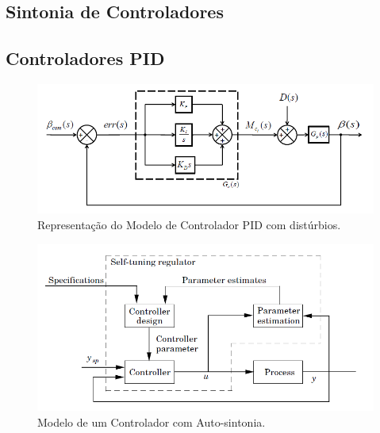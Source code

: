 \subsection{Sintonia de Controladores}


\subsection{Controladores PID}

\begin{figure}[htb]
  \caption{Representação do Modelo de Controlador PID com distúrbios.}
  \begin{center}
      \includegraphics[scale=0.75]{img/pid_controller_Snider_p35}
  \end{center}
  \label{fig:pid_controller_Snider_p35}
\end{figure}

\begin{figure}[htb]
  \caption{Modelo de um Controlador com Auto-sintonia.}
  \begin{center}
      \includegraphics[scale=0.75]{img/pid_adaptative_astrom_p233}
  \end{center}
  \label{fig:pid_adaptative_astrom_p233}
\end{figure}

